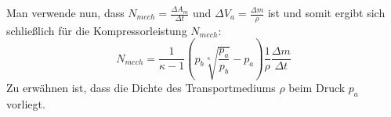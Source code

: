Man verwende nun, dass $N_{mech} = \frac{\Delta A_m}{\Delta t}$ und $\Delta V_a = \frac{\Delta m}{\rho}$ ist und somit ergibt sich schließlich für die Kompressorleistung $N_{mech}$:
\begin{equation}
	\label{eqn:kompressorleistung}
	N_{mech} = \frac{1}{\kappa - 1} (p_b \sqrt[\kappa]{\frac{p_a}{p_b}} - p_a) \frac{1}{\rho} \frac{\Delta m}{\Delta t}
\end{equation}
Zu erwähnen ist, dass die Dichte des Transportmediums $\rho$ beim Druck $p_a$ vorliegt.
